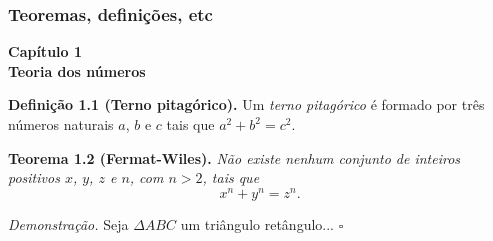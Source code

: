 \begin{frame}
    \frametitle{Teoremas, definições, etc}

    \begin{exemplo}\medskip
      \textbf{\Large Capítulo 1 \\[2mm] Teoria dos números} \bigskip\bigskip

      \small

      \textbf{Definição 1.1 (Terno pitagórico).}  
      Um \emph{terno pitagórico} é formado por três números naturais $a$,
      $b$ e $c$ tais que $a^2+b^2=c^2$.\bigskip
      
      \textbf{Teorema 1.2 (Fermat-Wiles).} 
      \textit{Não existe nenhum conjunto de inteiros positivos $x$, $y$, $z$ e
      $n$, com $n>2$, tais que}
      \[ x^n+y^n=z^n. \]
      
      \textit{Demonstração.} 
        Seja $\Delta ABC$ um triângulo retângulo... \hfill $\square$
      

    \end{exemplo}
  
\end{frame}



